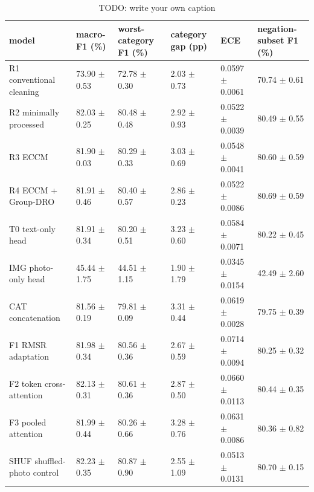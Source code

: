 \begin{table}
\caption{TODO: write your own caption}\label{tab:T14-amazon-all-models}
\scriptsize
\begin{tabularx}{\textheight}{>{\raggedright\arraybackslash}Xlllll}
\toprule
model & macro-F1 (\%) & worst-category F1 (\%) & category gap (pp) & ECE & negation-subset F1 (\%) \\
\midrule
R1 conventional cleaning & 73.90 $\pm$ 0.53 & 72.78 $\pm$ 0.30 & 2.03 $\pm$ 0.73 & 0.0597 $\pm$ 0.0061 & 70.74 $\pm$ 0.61 \\
R2 minimally processed & 82.03 $\pm$ 0.25 & 80.48 $\pm$ 0.48 & 2.92 $\pm$ 0.93 & 0.0522 $\pm$ 0.0039 & 80.49 $\pm$ 0.55 \\
R3 ECCM & 81.90 $\pm$ 0.03 & 80.29 $\pm$ 0.33 & 3.03 $\pm$ 0.69 & 0.0548 $\pm$ 0.0041 & 80.60 $\pm$ 0.59 \\
R4 ECCM + Group-DRO & 81.91 $\pm$ 0.46 & 80.40 $\pm$ 0.57 & 2.86 $\pm$ 0.23 & 0.0522 $\pm$ 0.0086 & 80.69 $\pm$ 0.59 \\
T0 text-only head & 81.91 $\pm$ 0.34 & 80.20 $\pm$ 0.51 & 3.23 $\pm$ 0.60 & 0.0584 $\pm$ 0.0071 & 80.22 $\pm$ 0.45 \\
IMG photo-only head & 45.44 $\pm$ 1.75 & 44.51 $\pm$ 1.15 & 1.90 $\pm$ 1.79 & 0.0345 $\pm$ 0.0154 & 42.49 $\pm$ 2.60 \\
CAT concatenation & 81.56 $\pm$ 0.19 & 79.81 $\pm$ 0.09 & 3.31 $\pm$ 0.44 & 0.0619 $\pm$ 0.0028 & 79.75 $\pm$ 0.39 \\
F1 RMSR adaptation & 81.98 $\pm$ 0.34 & 80.56 $\pm$ 0.36 & 2.67 $\pm$ 0.59 & 0.0714 $\pm$ 0.0094 & 80.25 $\pm$ 0.32 \\
F2 token cross-attention & 82.13 $\pm$ 0.31 & 80.61 $\pm$ 0.36 & 2.87 $\pm$ 0.50 & 0.0660 $\pm$ 0.0113 & 80.44 $\pm$ 0.35 \\
F3 pooled attention & 81.99 $\pm$ 0.44 & 80.26 $\pm$ 0.66 & 3.28 $\pm$ 0.76 & 0.0631 $\pm$ 0.0086 & 80.36 $\pm$ 0.82 \\
SHUF shuffled-photo control & 82.23 $\pm$ 0.35 & 80.87 $\pm$ 0.90 & 2.55 $\pm$ 1.09 & 0.0513 $\pm$ 0.0131 & 80.70 $\pm$ 0.15 \\
\bottomrule
\end{tabularx}
\par{}
\end{table}
